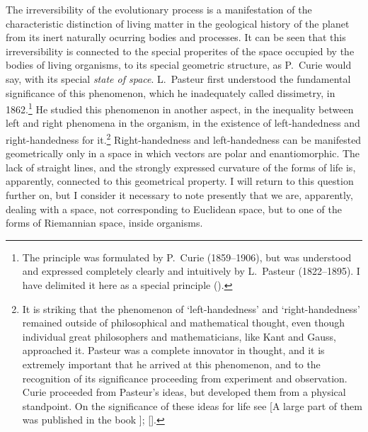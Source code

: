 \Section %
The irreversibility of the evolutionary process is a manifestation of the
characteristic distinction of living matter in the geological history of the
planet from its inert naturally ocurring bodies and processes.  It can be seen
that this irreversibility is connected to the special properites of the space
occupied by the bodies of living organisms, to its special geometric structure,
as P.~Curie would say, with its special \emph{state of
space}.  L.~Pasteur first
understood the fundamental significance of this phenomenon, which he
inadequately called dissimetry, in 1862.\footnote{
	The principle was formulated by P.~Curie (1859--1906), but was
	understood and expressed completely clearly and intuitively by
	L.~Pasteur (1822--1895).  I have delimited it here as a special
	principle (\cite{pasteur1922oeuvres, curie1908oeuvres}).
}  He studied this phenomenon in another aspect, in the inequality between
left and right phenomena in the organism, in the existence of left-handedness
and right-handedness for it.\footnote{
	It is striking that the phenomenon of `left-handedness' and
	`right-handedness' remained outside of philosophical and mathematical
	thought, even though individual great philosophers and mathematicians,
	like Kant and Gauss, approached it.  Pasteur was a complete innovator
	in thought, and it is extremely important that he arrived at this
	phenomenon, and to the recognition of its significance proceeding from
	experiment and observation.  Curie proceeded from Pasteur's ideas, but
	developed them from a physical standpoint.  On the significance of
	these ideas for life see \cite{vernadsky1940biogeohimicheskie} [A large
	part of them was published in the book
	\cite[22--271]{vernadsky1992trudy}]; \cite{vernadsky1934problemy1}
	[\cite{vernadsky1980problemy}].
}  Right-handedness and left-handedness can be manifested geometrically only in
a space in which vectors are polar and enantiomorphic.  The lack of straight
lines, and the strongly expressed curvature of the forms of life is,
apparently, connected to this geometrical property.  I will return to this
question further on, but I consider it necessary to note presently that we are,
apparently, dealing with a space, not corresponding to Euclidean space, but to
one of the forms of Riemannian space, inside organisms.

